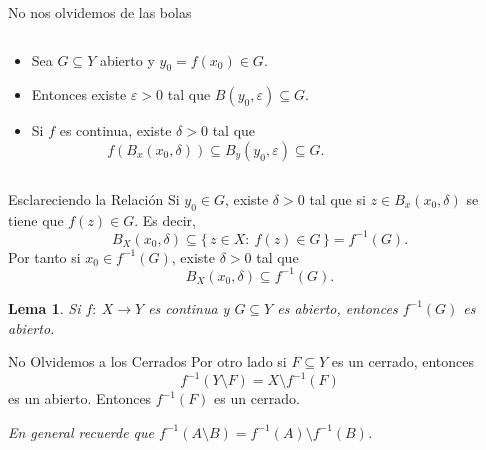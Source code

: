 \documentclass[utf8]{beamer}
\theoremstyle{plain}
\newtheorem{Lem}{Lema}                 %
\theoremstyle{definition}
\theoremstyle{remark}
\numberwithin{equation}{section}
\newcommand{\dl}{\delta}                %
\newcommand{\eps}{\varepsilon}          %
\newcommand{\set}[1]{\{\,#1\,\}}    %
\newcommand{\less}{\setminus}           %
\begin{document}
\begin{frame}{No nos olvidemos de las bolas}
    
    \begin{columns}
        \begin{column}{0.5\textwidth}
            \begin{itemize}
                \item Sea $G\subseteq Y$ abierto y $y_0=f(x_0)\in G$.\pause
                \item Entonces existe $\eps>0$ tal que $B(y_0,\eps)\subseteq G$.\pause
                \item Si $f$ es continua, existe $\dl>0$ tal que 
                $$f(B_x(x_0,\dl))\subseteq B_y(y_0,\eps)\subseteq G.$$
            \end{itemize}
            

                \end{column} 
                \begin{column}{0.5\textwidth}%
                    
                        \end{column}
                    \end{columns}
\end{frame}

\begin{frame}{Esclareciendo la Relaci\'on}
    Si $y_0\in G$, existe $\dl>0$ tal que si $z\in B_x(x_0,\dl)$ se tiene que $f(z)\in G$. Es decir,
    $$B_X(x_0,\dl)\subseteq \set{z\in X:\ f(z)\in G}=f^{-1}(G).$$
    Por tanto si $x_0\in f^{-1}(G)$, existe $\dl>0$ tal que 
    $$B_X(x_0,\dl)\subseteq f^{-1}(G).$$
    \begin{Lem}\label{lem:equiv1Cont}
        Si $f:\ X\to Y$ es continua y $G\subseteq Y$ es abierto, entonces $f^{-1}(G)$ es abierto.
    \end{Lem}

\end{frame}

\begin{frame}{No Olvidemos a los Cerrados}
    Por otro lado si $F\subseteq Y$ es un cerrado, entonces 
    $$f^{-1}(Y\less F)=X\less f^{-1}(F)$$
    es un abierto. Entonces $f^{-1}(F)$ es un cerrado.\par 
    \emph{En general recuerde que $f^{-1}(A\less B)=f^{-1}(A)\less f^{-1}(B)$.}
\end{frame}
\end{document}

